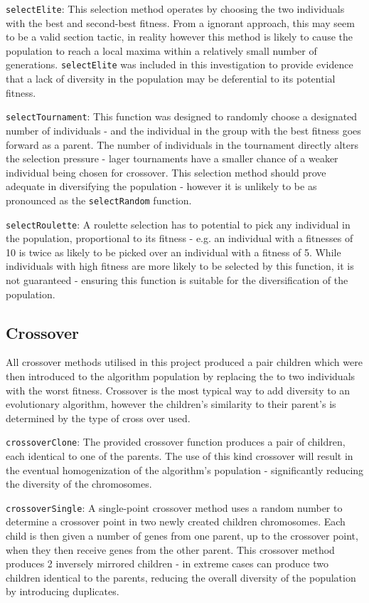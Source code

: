 			\texttt{selectElite}: This selection method operates by choosing the two individuals with the best and second-best fitness. From a ignorant approach, this may seem to be a valid section tactic, in reality however this method is likely to cause the population to reach a local maxima within a relatively small number of generations. \texttt{selectElite} was included in this investigation to provide evidence that a lack of diversity in the population may be deferential to its potential fitness.
			
			\texttt{selectTournament}: This function was designed to randomly choose a designated number of individuals - and the individual in the group with the best fitness goes forward as a parent. The number of individuals in the tournament directly alters the selection pressure - lager tournaments have a smaller chance of a weaker individual being chosen for crossover. This selection method should prove adequate in diversifying the population - however it is unlikely to be as pronounced as the \texttt{selectRandom} function.
			
			\texttt{selectRoulette}: A roulette selection has to potential to pick any individual in the population, proportional to its fitness - e.g. an individual with a fitnesses of 10 is twice as likely to be picked over an individual with a fitness of 5. While individuals with high fitness are more likely to be selected by this function, it is not guaranteed - ensuring this function is suitable for the diversification of the population.
		
		\subsection{Crossover}
		All  crossover methods utilised in this project produced a pair children which were then introduced to the algorithm population by replacing the to two individuals with the worst fitness. Crossover is the most typical way to add diversity to an evolutionary algorithm, however the children's similarity to their parent's is determined by the type of cross over used.
	
			\texttt{crossoverClone}: The provided crossover function produces a pair of children, each identical to one of the parents. The use of this kind crossover will result in the eventual homogenization of the algorithm's population - significantly reducing the diversity of the chromosomes. 
		
			\texttt{crossoverSingle}: A single-point crossover method uses a random number to determine a crossover point in two newly created children chromosomes. Each child is then given a number of genes from one parent, up to the crossover point, when they then receive genes from the other parent. This crossover method produces 2 inversely mirrored children - in extreme cases can produce two children identical to the parents, reducing the overall diversity of the population by introducing duplicates. 
			
